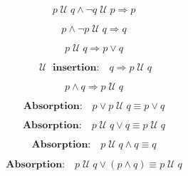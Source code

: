 \documentclass[12pt, fleqn, leqno]{article}
\newcommand{\impl}{\ensuremath{\Rightarrow}}        %
\newcommand{\Until}{\;\mathcal{U}\;}
\newcommand{\spacer}{\vspace{-30pt}}
\begin{document}
\spacer

\begin{equation}\label{E:pUntilQAndNotQUntilP}
p \Until q \land \neg q \Until p \impl p
\end{equation}

\spacer

\begin{equation}\label{E:pAndNotPUntilQ}
p\land \neg p \Until q \impl q
\end{equation}

\spacer

\begin{equation}\label{E:untilImpOr}
p \Until q \impl p \lor q
\end{equation}

\spacer

\begin{equation}\label{E:untilInsertion}
\textbf{$\Until$ insertion:}\quad q \impl p \Until q
\end{equation}

\spacer

\begin{equation}\label{E:andImplUntil}
p \land q \impl p \Until q
\end{equation}

\spacer

\begin{equation}\label{E:untilOrP}
\textbf{Absorption:}\quad p \lor p \Until q \equiv p \lor q
\end{equation}

\spacer

\begin{equation}\label{E:untilOrQ}
\textbf{Absorption:}\quad p \Until q \lor q \equiv p \Until q
\end{equation}

\spacer

\begin{equation}\label{E:untilAndQ}
\textbf{Absorption:}\quad p \Until q \land q \equiv q
\end{equation}

\spacer

\begin{equation}\label{E:untilOrAnd}
\textbf{Absorption:}\quad p \Until q \lor (p \land q) \equiv p \Until q
\end{equation}

\spacer
\end{document}
